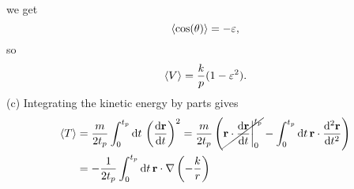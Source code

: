 \documentclass{article}
\begin{document}
        we get
        \begin{equation*}
            \expval{\cos(\theta)} = - \varepsilon,
        \end{equation*}
        so
        \begin{equation*}
            \expval{V} = \frac{k}{p}(1 - \varepsilon^2).
        \end{equation*}
        (c) Integrating the  kinetic energy by parts gives 
        \begin{align*}
            \expval{T} & = \frac{m}{2 t_p}   \int_0^{t_p} \dd t \, \left(\dv{\mathbf{r}}{t}\right)^2 
            = \frac{m}{2 t_p} \left(\cancel{\mathbf{r} \cdot \dv{\mathbf{r}}{t}\bigg|_0^{t_p} } -   \int_0^{t_p} \dd t \, \mathbf{r} \cdot\dv[2]{\mathbf{r}}{t}\right) \\
            &  = - \frac{1}{2 t_p} \int_0^{t_p} \dd t \, \mathbf{r} \cdot \nabla \left(- \frac{k}{r} \right)
        \end{align*}
\end{document}
